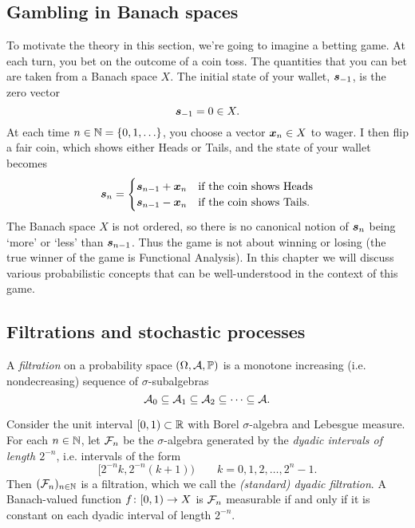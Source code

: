 

\subsection{Gambling in Banach spaces}\label{sec:gambling}

To motivate the theory in this section, we're going to imagine a betting game.
At each turn, you bet on the outcome of a coin toss.
The quantities that you can bet are taken from a Banach space $X$.
The initial state of your wallet, $\bm{s}_{-1}$, is the zero vector
\begin{equation*}
  \bm{s}_{-1} = 0 \in X.
\end{equation*}
At each time $n \in \mathbb{N} = \{0,1,\ldots\}$, you choose a vector $\bm{x}_n \in X$ to wager.
I then flip a fair coin, which shows either Heads or Tails, and the state of your wallet becomes
\begin{equation*}
  \bm{s}_n =
  \begin{cases}
    \bm{s}_{n-1} + \bm{x}_n & \text{if the coin shows Heads} \\
    \bm{s}_{n-1} - \bm{x}_n & \text{if the coin shows Tails.}
  \end{cases}
\end{equation*}
The Banach space $X$ is not ordered, so there is no canonical notion of $\bm{s}_n$ being `more' or `less' than $\bm{s}_{n-1}$. Thus the game is not about winning or losing (the true winner of the game is Functional Analysis).
In this chapter we will discuss various probabilistic concepts that can be well-understood in the context of this game.


\subsection{Filtrations and stochastic processes}

\begin{defn}
  A \emph{filtration} on a probability space $(\Omega,\mathcal{A},\mathbb{P})$ is a monotone increasing (i.e. nondecreasing) sequence of $\sigma$-subalgebras
  \begin{equation*}
    \mathcal{A}_0 \subseteq \mathcal{A}_1 \subseteq \mathcal{A}_2 \subseteq \cdots \subseteq \mathcal{A}.
  \end{equation*}
\end{defn}

\begin{example}\label{eg:dyadic-filtration}
  Consider the unit interval $[0,1) \subset \mathbb{R}$ with Borel $\sigma$-algebra and Lebesgue measure.
  For each $n \in \mathbb{N}$, let $\mathcal{F}_n$ be the $\sigma$-algebra generated by the \emph{dyadic intervals of length $2^{-n}$}, i.e. intervals of the form
  \begin{equation*}
    [2^{-n}k, 2^{-n}(k+1)) \qquad k = 0, 1, 2, \ldots, 2^{n}- 1.
  \end{equation*}
  Then $(\mathcal{F}_n)_{n \in \mathbb{N}}$ is a filtration, which we call the \emph{(standard) dyadic filtration}.
  A Banach-valued function $f \colon [0,1) \rightarrow X$ is $\mathcal{F}_n$ measurable if and only if it is constant on each dyadic interval of length $2^{-n}$.  
\end{example}

